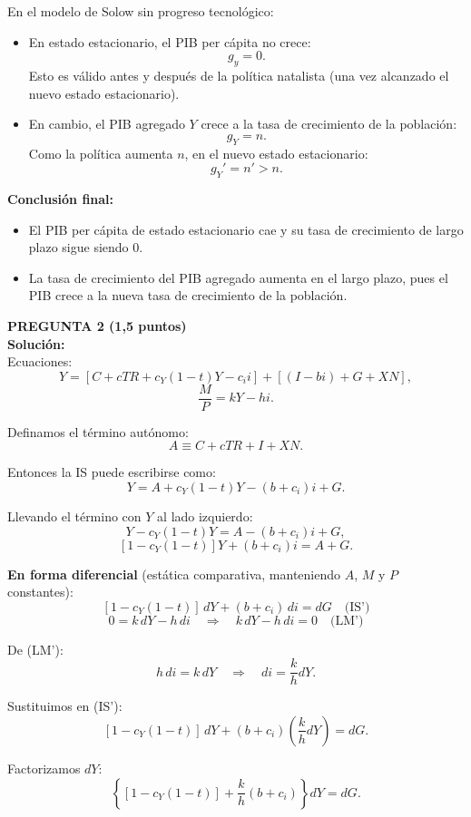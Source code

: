 \documentclass[11pt,addpoints]{article}
\begin{document}
En el modelo de Solow sin progreso tecnológico:
\begin{itemize}
  \item En estado estacionario, el PIB per cápita no crece:
  \[
  g_{y} = 0.
  \]
  Esto es válido antes y después de la política natalista (una vez alcanzado el nuevo estado estacionario).

  \item En cambio, el PIB agregado $Y$ crece a la tasa de crecimiento de la población:
  \[
  g_Y = n.
  \]
  Como la política aumenta $n$, en el nuevo estado estacionario:
  \[
  g_Y' = n' > n.
  \]
\end{itemize}
\newpage
\vspace*{0.5cm}
\textbf{Conclusión final:}
\begin{itemize}
  \item El PIB per cápita de estado estacionario cae y su tasa de crecimiento de largo plazo sigue siendo 0.
  \item La tasa de crecimiento del PIB agregado aumenta en el largo plazo, pues el PIB crece a la nueva tasa de crecimiento de la población.
\end{itemize}


\textbf{PREGUNTA 2 (1,5 puntos)}\\
\textbf{Solución:}\\

Ecuaciones:
\[
Y = [C + cTR + c_Y (1 - t)Y - c_i i] + [(I - bi) + G + XN],
\]
\[
\frac{M}{P} = kY - hi.
\]

Definamos el término autónomo:
\[
A \equiv C + cTR + I + XN.
\]

Entonces la IS puede escribirse como:
\[
Y = A + c_Y(1 - t)Y - (b + c_i)i + G.
\]

Llevando el término con $Y$ al lado izquierdo:
\[
Y - c_Y(1 - t)Y = A - (b + c_i)i + G,
\]
\[
[1 - c_Y(1 - t)]Y + (b + c_i)i = A + G.
\]

\textbf{En forma diferencial} (estática comparativa, manteniendo $A$, $M$ y $P$ constantes):
\[
[1 - c_Y(1 - t)]\,dY + (b + c_i)\,di = dG \quad\text{(IS')}
\]
\[
0 = k\,dY - h\,di \quad\Rightarrow\quad k\,dY - h\,di = 0 \quad\text{(LM')}
\]

De (LM'):
\[
h\,di = k\,dY \quad\Rightarrow\quad di = \frac{k}{h}dY.
\]

Sustituimos en (IS'):
\[
[1 - c_Y(1 - t)]\,dY + (b + c_i)\left(\frac{k}{h}dY\right) = dG.
\]

Factorizamos $dY$:
\[
\left\{[1 - c_Y(1 - t)] + \frac{k}{h}(b + c_i)\right\} dY = dG.
\]
\end{document}
